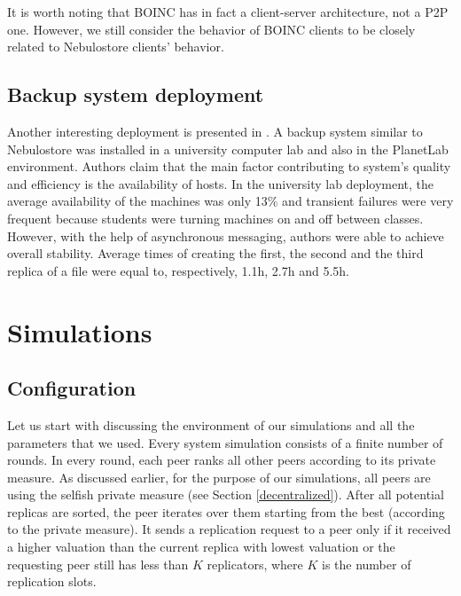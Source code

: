 \documentclass{pracamgren}
\begin{document}
It is worth noting that BOINC has in fact a client-server architecture, not a P2P one. However, we still consider the behavior of BOINC clients to be closely related to Nebulostore clients' behavior.\\

\subsection{Backup system deployment}

Another interesting deployment is presented in \cite{hetero}. A backup system similar to Nebulostore was installed in a university computer lab and also in the PlanetLab environment. Authors claim that the main factor contributing to system's quality and efficiency is the availability of hosts. In the university lab deployment, the average availability of the machines was only 13\% and transient failures were very frequent because students were turning machines on and off between classes. However, with the help of asynchronous messaging, authors were able to achieve overall stability. Average times of creating the first, the second and the third replica of a file were equal to, respectively, 1.1h, 2.7h and 5.5h.\\

\section{Simulations}

\subsection{Configuration}

Let us start with discussing the environment of our simulations and all the parameters that we used. Every system simulation consists of a finite number of rounds. In every round, each peer ranks all other peers according to its private measure. As discussed earlier, for the purpose of our simulations, all peers are using the selfish private measure (see Section \ref{decentralized}). After all potential replicas are sorted, the peer iterates over them starting from the best (according to the private measure). It sends a replication request to a peer only if it received a higher valuation than the current replica with lowest valuation or the requesting peer still has less than $K$ replicators, where $K$ is the number of replication slots.\\
\end{document}

